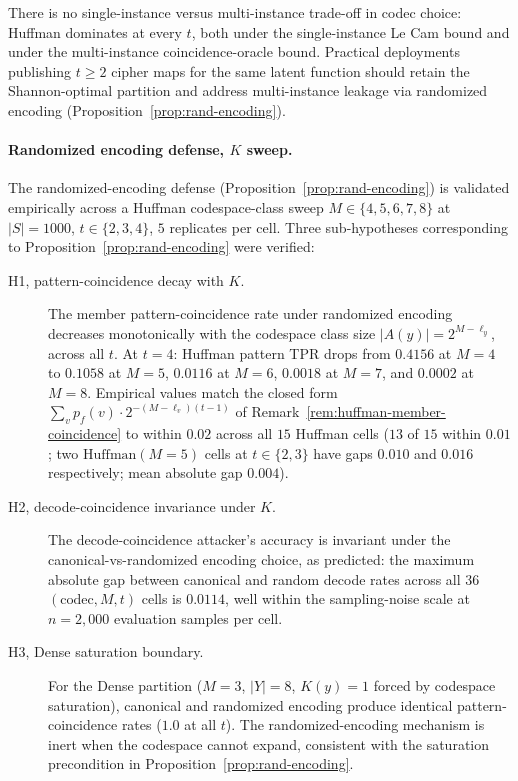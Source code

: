 \documentclass[11pt]{article}
\theoremstyle{definition}
\theoremstyle{plain}
\theoremstyle{remark}
\begin{document}
There is no single-instance versus multi-instance trade-off in
codec choice: Huffman dominates at every $t$, both under the
single-instance Le Cam bound and under the multi-instance
coincidence-oracle bound.  Practical deployments publishing $t \geq 2$
cipher maps for the same latent function should retain the
Shannon-optimal partition and address multi-instance leakage via
randomized encoding (Proposition~\ref{prop:rand-encoding}).

\paragraph{Randomized encoding defense, $K$ sweep.}
The randomized-encoding defense (Proposition~\ref{prop:rand-encoding})
is validated empirically across a Huffman codespace-class sweep
$M \in \{4, 5, 6, 7, 8\}$ at $|S| = 1000$, $t \in \{2, 3, 4\}$, $5$
replicates per cell.  Three sub-hypotheses corresponding to
Proposition~\ref{prop:rand-encoding} were verified:

\begin{description}
\item[H1, pattern-coincidence decay with $K$.]
The member pattern-coincidence rate under randomized encoding
decreases monotonically with the codespace class size $|A(y)| =
2^{M - \ell_y}$, across all $t$.  At $t = 4$: Huffman pattern TPR
drops from $0.4156$ at $M = 4$ to $0.1058$ at $M = 5$, $0.0116$ at
$M = 6$, $0.0018$ at $M = 7$, and $0.0002$ at $M = 8$.  Empirical
values match the closed form
$\sum_v p_f(v) \cdot 2^{-(M - \ell_v)(t - 1)}$ of
Remark~\ref{rem:huffman-member-coincidence} to within $0.02$ across
all $15$ Huffman cells ($13$ of $15$ within $0.01$; two
$\mathrm{Huffman}(M{=}5)$ cells at $t \in \{2, 3\}$ have gaps
$0.010$ and $0.016$ respectively; mean absolute gap $0.004$).

\item[H2, decode-coincidence invariance under $K$.]
The decode-coincidence attacker's accuracy is invariant under the
canonical-vs-randomized encoding choice, as predicted: the maximum
absolute gap between canonical and random decode rates across all
$36$ $(\text{codec}, M, t)$ cells is $0.0114$, well within the
sampling-noise scale at $n = 2{,}000$ evaluation samples per cell.

\item[H3, Dense saturation boundary.]
For the Dense partition ($M = 3$, $|Y| = 8$, $K(y) = 1$ forced by
codespace saturation), canonical and randomized encoding produce
identical pattern-coincidence rates ($1.0$ at all $t$).  The
randomized-encoding mechanism is inert when the codespace cannot
expand, consistent with the saturation precondition in
Proposition~\ref{prop:rand-encoding}.
\end{description}
\end{document}
